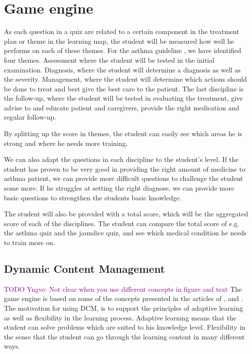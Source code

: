 \section{Game engine}



As each question in a quiz are related to a certain component in the treatment plan or theme in the learning map, the student will be measured how well he performs on each of these themes. For the asthma guideline \parencite{RepublicofKeny2016}, we have identified four themes. Assessment where the student will be tested in the initial examination. Diagnosis, where the student will determine a diagnosis as well as the severity. Management, where the student will determine which actions should be done to treat and best give the best care to the patient. The last discipline is the follow-up, where the student will be tested in evaluating the treatment, give advise to and educate patient and caregivers, provide the right medication and regular follow-up.

By splitting up the score in themes, the student can easily see which areas he is strong and where he needs more training. 



We can also adapt the questions in each discipline to the student's level. If the student has proven to be very good in providing the right amount of medicine to asthma patient, we can provide more difficult questions to challenge the student some more. If he struggles at setting the right diagnose, we can provide more basic questions to strengthen the students basic knowledge. 




The student will also be provided with a total score, which will be the aggregated score of each of the disciplines. The student can compare the total score of e.g. the asthma quiz and the jaundice quiz, and see which medical condition he needs to train more on.


\subsection{Dynamic Content Management}
\textcolor{purple}{TODO Yngve: Not clear when you use different concepts in figure and text}
The game engine is based on some of the concepts presented in the articles of \textcite{Eide2008}, \textcite{Kristensen2011} and \textcite{Kristensen2013}. The motivation for using DCM, is to support the principles of adaptive learning as well as flexibility in the learning process. Adaptive learning means that the student can solve problems which are suited to his knowledge level. Flexibility in the sense that the student can go through the learning content in many different ways.

